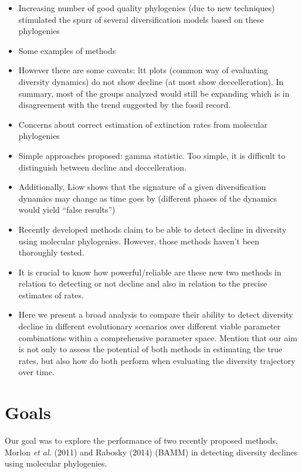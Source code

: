 \documentclass[11pt,]{article}
\begin{document}
\begin{itemize}
\item
  Increasing number of good quality phylogenies (due to new techniques)
  stimulated the spurr of several diversification models based on these
  phylogenies
\item
  Some examples of methods
\item
  However there are some caveats: ltt plots (common way of evaluating
  diversity dynamics) do not show decline (at most show deccelleration).
  In summary, most of the groups analyzed would still be expanding which
  is in disagreement with the trend suggested by the fossil record.
\item
  Concerns about correct estimation of extinction rates from molecular
  phylogenies
\item
  Simple approaches proposed: gamma statistic. Too simple, it is
  difficult to distinguish between decline and deccelleration.
\item
  Additionally, Liow shows that the signature of a given diversification
  dynamics may change as time goes by (different phases of the dynamics
  would yield ``false results'')
\item
  Recently developed methods claim to be able to detect decline in
  diversity using molecular phylogenies. However, those methods haven't
  been thoroughly tested.
\item
  It is crucial to know how powerful/reliable are these new two methods
  in relation to detecting or not decline and also in relation to the
  precise estimates of rates.
\item
  Here we present a broad analysis to compare their ability to detect
  diversity decline in different evolutionary scenarios over different
  viable parameter combinations within a comprehensive parameter space.
  Mention that our aim is not only to assess the potential of both
  methods in estimating the true rates, but also how do both perform
  when evaluating the diversity trajectory over time.
\end{itemize}

\section{Goals}\label{goals}

Our goal was to explore the performance of two recently proposed
methods, Morlon \emph{et al.} (2011) and Rabosky (2014) (BAMM) in
detecting diversity declines using molecular phylogenies.
\end{document}
